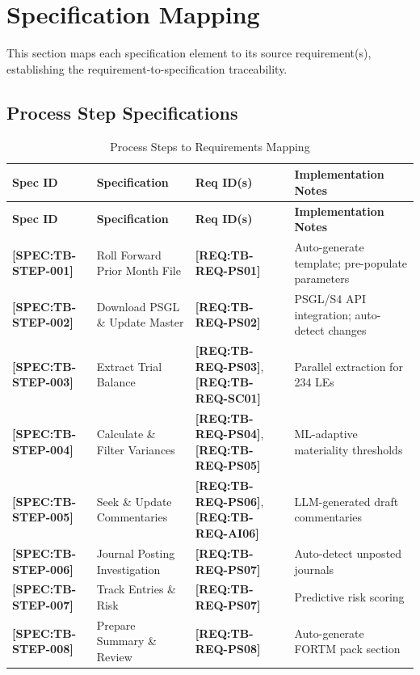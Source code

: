 \documentclass[11pt,a4paper]{article}
\newcommand{\reqref}[1]{\textcolor{reqpurple}{\textbf{[REQ:#1]}}}
\newcommand{\specref}[1]{\textcolor{specblue}{\textbf{[SPEC:#1]}}}
\begin{document}

\newpage
\section{Specification Mapping}

This section maps each specification element to its source requirement(s), 
establishing the requirement-to-specification traceability.

\subsection{Process Step Specifications}

\begin{longtable}{@{}C{2cm}L{3.5cm}C{2.5cm}L{5.5cm}@{}}
\caption{Process Steps to Requirements Mapping} \\
\toprule
\textbf{Spec ID} & \textbf{Specification} & \textbf{Req ID(s)} & \textbf{Implementation Notes} \\
\midrule
\endfirsthead
\toprule
\textbf{Spec ID} & \textbf{Specification} & \textbf{Req ID(s)} & \textbf{Implementation Notes} \\
\midrule
\endhead
\specref{TB-STEP-001} & Roll Forward Prior Month File & \reqref{TB-REQ-PS01} & Auto-generate template; pre-populate parameters \\
\specref{TB-STEP-002} & Download PSGL \& Update Master & \reqref{TB-REQ-PS02} & PSGL/S4 API integration; auto-detect changes \\
\specref{TB-STEP-003} & Extract Trial Balance & \reqref{TB-REQ-PS03}, \reqref{TB-REQ-SC01} & Parallel extraction for 234 LEs \\
\specref{TB-STEP-004} & Calculate \& Filter Variances & \reqref{TB-REQ-PS04}, \reqref{TB-REQ-PS05} & ML-adaptive materiality thresholds \\
\specref{TB-STEP-005} & Seek \& Update Commentaries & \reqref{TB-REQ-PS06}, \reqref{TB-REQ-AI06} & LLM-generated draft commentaries \\
\specref{TB-STEP-006} & Journal Posting Investigation & \reqref{TB-REQ-PS07} & Auto-detect unposted journals \\
\specref{TB-STEP-007} & Track Entries \& Risk & \reqref{TB-REQ-PS07} & Predictive risk scoring \\
\specref{TB-STEP-008} & Prepare Summary \& Review & \reqref{TB-REQ-PS08} & Auto-generate FORTM pack section \\
\bottomrule
\end{longtable}
\end{document}
